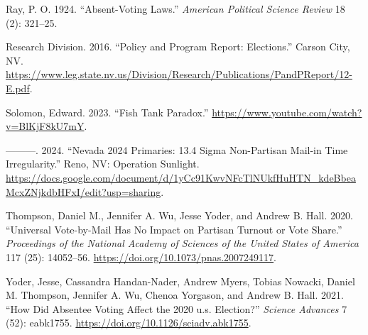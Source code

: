 \documentclass[12pt]{article}
\newlength{\cslhangindent}
\newlength{\cslentryspacingunit} %
\newenvironment{CSLReferences}[2] %
 {%
  \setlength{\parindent}{0pt}
  \ifodd #1
  \let\oldpar\par
  \def\par{\hangindent=\cslhangindent\oldpar}
  \fi
  \setlength{\parskip}{#2\cslentryspacingunit}
 }%
 {}
\begin{document}
\begin{CSLReferences}{1}{0}
\leavevmode{}%
Ray, P. O. 1924. {``Absent-Voting Laws.''} \emph{American Political Science Review} 18 (2): 321--25.

\leavevmode{}%
Research Division. 2016. {``Policy and Program Report: Elections.''} Carson City, NV. \url{https://www.leg.state.nv.us/Division/Research/Publications/PandPReport/12-E.pdf}.

\leavevmode{}%
Solomon, Edward. 2023. {``Fish Tank Paradox.''} \url{https://www.youtube.com/watch?v=BlKjF8kU7mY}.

\leavevmode{}%
---------. 2024. {``Nevada 2024 Primaries: 13.4 Sigma Non-Partisan Mail-in Time Irregularity.''} Reno, NV: Operation Sunlight. \url{https://docs.google.com/document/d/1yCc91KwvNFcTlNUkfHuHTN_kdeBbeaMcxZNjkdbHFxI/edit?usp=sharing}.

\leavevmode{}%
Thompson, Daniel M., Jennifer A. Wu, Jesse Yoder, and Andrew B. Hall. 2020. {``Universal Vote-by-Mail Has No Impact on Partisan Turnout or Vote Share.''} \emph{Proceedings of the National Academy of Sciences of the United States of America} 117 (25): 14052--56. \url{https://doi.org/10.1073/pnas.2007249117}.

\leavevmode{}%
Yoder, Jesse, Cassandra Handan-Nader, Andrew Myers, Tobias Nowacki, Daniel M. Thompson, Jennifer A. Wu, Chenoa Yorgason, and Andrew B. Hall. 2021. {``How Did Absentee Voting Affect the 2020 u.s. Election?''} \emph{Science Advances} 7 (52): eabk1755. \url{https://doi.org/10.1126/sciadv.abk1755}.

\end{CSLReferences}


\renewcommand\refname{References}
\thispagestyle{empty}
\singlespacing
{}

\end{document}
